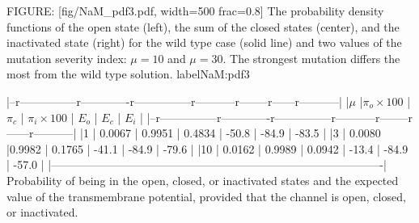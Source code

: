 FIGURE: [fig/NaM_pdf3.pdf, width=500 frac=0.8] The probability density functions of the open state (left),
the sum of the closed states  (center), and the inactivated state (right) 
for the wild type case (solid line) and two values of the mutation severity 
index: $\mu=10$ and $\mu=30$. The strongest mutation differs the most
from the wild type solution. 
 label{NaM:pdf3}%



|--r---------------r-------------r---------------r-----------r--------r------r-----------|
|$\mu$  |$\pi_o\times 100 $ | $\pi_c$ | $\pi_i\times 100$ | $E_o$ | $E_c$ | $E_i$        |
|--r---------------r-------------r---------------r-----------r--------r------r-----------|
|1      | 0.0067            | 0.9951  | 0.4834            | -50.8 | -84.9 | -83.5        |
|3      | 0.0080            |0.9982   | 0.1765            | -41.1 | -84.9 | -79.6        |
|10     | 0.0162            | 0.9989  | 0.0942            | -13.4 | -84.9 | -57.0        |
|----------------------------------------------------------------------------------------|
Probability of being in the open, closed, or inactivated states and the expected value of the transmembrane
potential, provided that the channel is open, closed, or inactivated.





